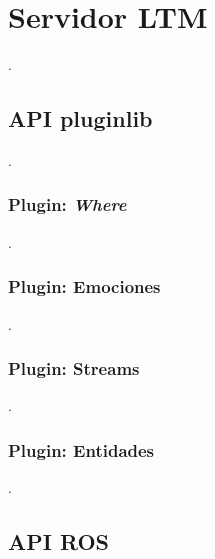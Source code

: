 \section{Servidor LTM}

.

\subsection{API pluginlib}

.
\subsubsection{Plugin: \textit{Where}}

.
\subsubsection{Plugin: Emociones}

.
\subsubsection{Plugin: Streams}

.
\subsubsection{Plugin: Entidades}

.

\subsection{API ROS}

